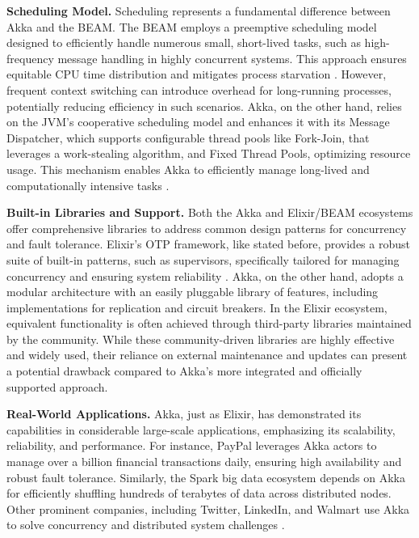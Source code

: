 \textbf{Scheduling Model.} Scheduling represents a fundamental difference between Akka and the \gls{BEAM}. The \gls{BEAM} employs a preemptive scheduling model designed to efficiently handle numerous small, short-lived tasks, such as high-frequency message handling in highly concurrent systems. This approach ensures equitable CPU time distribution and mitigates process starvation \cite{Juric2024,elixir-docs-hexdocs,erlang-concurrency-blog}. However, frequent context switching can introduce overhead for long-running processes, potentially reducing efficiency in such scenarios. Akka, on the other hand, relies on the \gls{JVM}’s cooperative scheduling model and enhances it with its Message Dispatcher, which supports configurable thread pools like Fork-Join, that leverages a work-stealing algorithm, and Fixed Thread Pools, optimizing resource usage. This mechanism enables Akka to efficiently manage long-lived and computationally intensive tasks \cite{akka-docs,Abraham2023}.

\textbf{Built-in Libraries and Support.} Both the Akka and Elixir/\gls{BEAM} ecosystems offer comprehensive libraries to address common design patterns for concurrency and fault tolerance. Elixir’s \gls{OTP} framework, like stated before, provides a robust suite of built-in patterns, such as supervisors, specifically tailored for managing concurrency and ensuring system reliability \cite{erlang-concurrency-blog,elixir-docs-hexdocs}. Akka, on the other hand, adopts a modular architecture with an easily pluggable library of features, including implementations for replication and circuit breakers. In the Elixir ecosystem, equivalent functionality is often achieved through third-party libraries maintained by the community. While these community-driven libraries are highly effective and widely used, their reliance on external maintenance and updates can present a potential drawback compared to Akka’s more integrated and officially supported approach.

\textbf{Real-World Applications.} Akka, just as Elixir, has demonstrated its capabilities in considerable large-scale applications, emphasizing its scalability, reliability, and performance. For instance, PayPal leverages Akka actors to manage over a billion financial transactions daily, ensuring high availability and robust fault tolerance\cite{Bagherzadeh2020}. Similarly, the Spark big data ecosystem depends on Akka for efficiently shuffling hundreds of terabytes of data across distributed nodes. Other prominent companies, including Twitter, LinkedIn, and Walmart use Akka to solve concurrency and distributed system challenges \cite{Bagherzadeh2020,akka-docs}.


